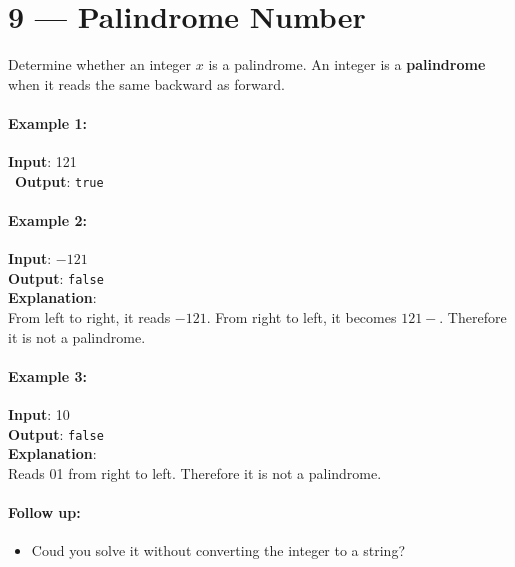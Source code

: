 \section{9 --- Palindrome Number}
Determine whether an integer $x$ is a palindrome. An integer is a \textbf{palindrome} when it reads the same backward as forward.

\paragraph{Example 1:}

\begin{flushleft}
\textbf{Input}: 121
\\\
\textbf{Output}: \texttt{true}
\end{flushleft}

\paragraph{Example 2:}

\begin{flushleft}
\textbf{Input}: $-121$
\\
\textbf{Output}: \texttt{false}
\\
\textbf{Explanation}: 
\\
From left to right, it reads $-121$. From right to left, it becomes $121-$. Therefore it is not a palindrome.
\end{flushleft}

\paragraph{Example 3:}

\begin{flushleft}
\textbf{Input}: 10
\\
\textbf{Output}: \texttt{false}
\\
\textbf{Explanation}:
\\ 
Reads 01 from right to left. Therefore it is not a palindrome.
\end{flushleft}

\paragraph{Follow up:}

\begin{itemize}
\item Coud you solve it without converting the integer to a string?
\end{itemize}

